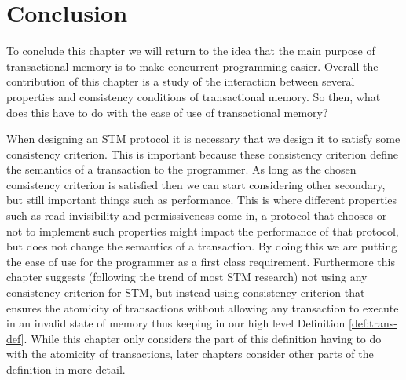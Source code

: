 





\section{Conclusion}
\label{sec:conclusion}

To conclude this chapter we will return to the idea that the main purpose of
transactional memory is to make concurrent programming easier.
Overall the contribution of this chapter is a study of the interaction
between several properties and consistency conditions of transactional memory.
So then, what does this have to do with the ease of use of 
transactional memory?

When designing an STM protocol it is necessary that we design it to satisfy
some consistency criterion.
This is important because these consistency criterion define the semantics
of a transaction to the programmer.
As long as the chosen consistency criterion is satisfied then we can start considering other
secondary, but still important things such as performance.
This is where different properties such as read invisibility and permissiveness
come in, a protocol that chooses or not to implement such properties might impact
the performance of that protocol, but does not change the semantics of a transaction.
By doing this we are putting the ease of use for the programmer as a first class requirement.
Furthermore this chapter suggests (following the trend of most STM research)
not using any consistency criterion for STM, but instead
using consistency criterion that ensures the atomicity
of transactions without allowing any transaction to execute in an invalid state of memory
thus keeping in our high level Definition \ref{def:trans-def}.
While this chapter only considers the part of this definition having to do with the
atomicity of transactions, later chapters consider other parts of the definition
in more detail.


